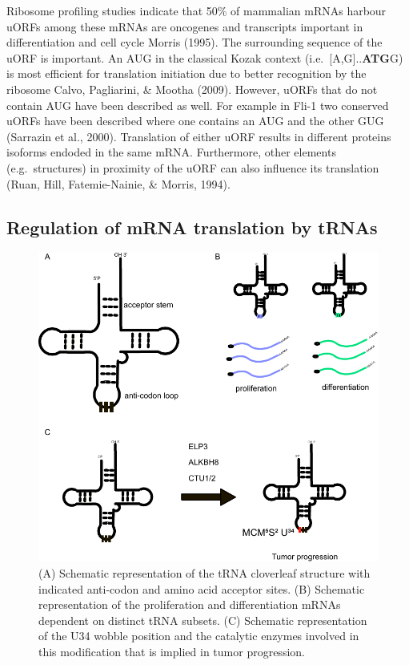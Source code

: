 \documentclass[
  12pt,
  openany]{book}
\begin{document}
Ribosome profiling studies indicate that 50\% of mammalian mRNAs harbour uORFs among these mRNAs are oncogenes and transcripts important in differentiation and cell cycle Morris (1995). The surrounding sequence of the uORF is important. An AUG in the classical Kozak context (i.e.~{[}A,G{]}..\textbf{ATG}G) is most efficient for translation initiation due to better recognition by the ribosome Calvo, Pagliarini, \& Mootha (2009). However, uORFs that do not contain AUG have been described as well. For example in Fli-1 two conserved uORFs have been described where one contains an AUG and the other GUG (Sarrazin et al., 2000). Translation of either uORF results in different proteins isoforms endoded in the same mRNA. Furthermore, other elements (e.g.~structures) in proximity of the uORF can also influence its translation (Ruan, Hill, Fatemie-Nainie, \& Morris, 1994).

\subsection{Regulation of mRNA translation by tRNAs} \label{tRNA}
\begin{figure}
  \includegraphics{./figures/tRNA.pdf}
  \caption{ (A) Schematic representation of the tRNA cloverleaf structure with indicated anti-codon and amino acid acceptor sites.  (B) Schematic representation of the proliferation and differentiation mRNAs dependent on distinct tRNA subsets. (C) Schematic representation of the U34 wobble position and the catalytic enzymes involved in this modification that is implied in tumor progression.
 \label{fig:tRNA}}
\end{figure}
\end{document}
